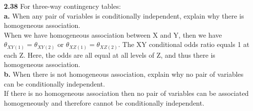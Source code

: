\documentclass[paper=letter, fontsize=11pt]{scrartcl} %
\begin{document}
\textbf{2.38} For three-way contingency tables: \\

\textbf{a.} When any pair of variables is conditionally independent, explain why there is
homogeneous association. \\

When we have homogeneous association between X and Y, then we have
$\theta_{XY(1)} = \theta_{XY(2)}$ or $\theta_{XZ(1)} = \theta_{XZ(2)}$. The XY conditional
odds ratio equals 1 at each Z. Here, the odds are all equal at all levels of Z, and thus
there is homogeneous association. \\


\textbf{b.} When there is not homogeneous association, explain why no pair of variables can
be conditionally independent. \\

If there is no homogeneous association then no pair of variables can be associated homogeneously
 and therefore cannot be conditionally independent.\\
\end{document}
